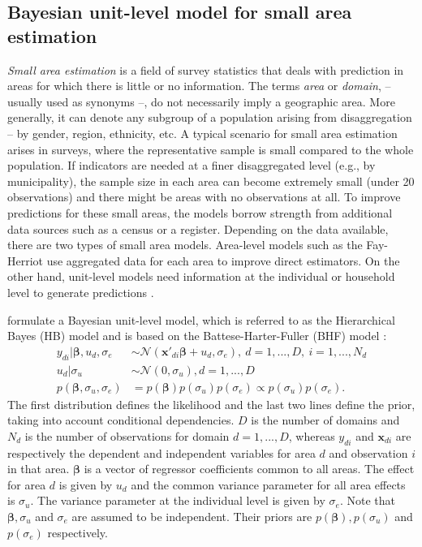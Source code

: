 \subsection{Bayesian unit-level model for small area estimation}

\textit{Small area estimation} is a field of survey statistics that deals with prediction in areas for which there is little or no information.
The terms \textit{area} or \textit{domain}, – usually used as synonyms –, do not necessarily imply a geographic area.
More generally, it can denote any subgroup of a population arising from disaggregation – by gender, region, ethnicity, etc.
A typical scenario for small area estimation arises in surveys, where the representative sample is small compared to the whole population.
If indicators are needed at a finer disaggregated level (e.g., by municipality), the sample size in each area can become extremely small (under 20 observations) and there might be areas with no observations at all.
To improve predictions for these small areas, the models borrow strength from additional data sources such as a census or a register.
Depending on the data available, there are two types of small area models.
Area-level models such as the Fay-Herriot use aggregated data for each area to improve direct estimators.
On the other hand, unit-level models need information at the individual or household level to generate predictions \citep[Chapter 1 and 2]{rao_small_2015}.

\cite{molina_small_2014} formulate a Bayesian unit-level model, which is referred to as the Hierarchical Bayes (HB) model and is based on the Battese-Harter-Fuller (BHF) model \citep{battese_error_1988}:
\begin{equation}
    \label{eq:hb_rao}
	\begin{split}
	y_{di} |\boldsymbol \beta, u_d, \sigma_e & \sim \mathcal N(\boldsymbol{x'}_{di} \boldsymbol{\beta}+ u_d, \sigma_e), ~ d = 1, ..., D, ~ i = 1, ..., N_d \\
	u_d | \sigma_u & \sim \mathcal N(0, \sigma_u), d = 1, ..., D \\
	p(\boldsymbol \beta, \sigma_u, \sigma_e) & = p(\boldsymbol \beta) p(\sigma_u)p(\sigma_e) \propto p(\sigma_u)p(\sigma_e).
	\end{split}
\end{equation}
The first distribution defines the likelihood and the last two lines define the prior, taking into account conditional dependencies.
$D$ is the number of domains and $N_d$ is the number of observations for domain $d = 1, ..., D$, whereas $y_{di}$ and $\boldsymbol{x}_{di}$ are respectively the dependent and independent variables for area $d$ and observation $i$ in that area.
$\boldsymbol \beta$ is a vector of regressor coefficients common to all areas.
The effect for area $d$ is given by $u_d$ and the common variance parameter for all area effects is $\sigma_u$.
The variance parameter at the individual level is given by $\sigma_e$.
Note that $\boldsymbol \beta, \sigma_u$ and $\sigma_e$ are assumed to be independent.
Their priors are $p(\boldsymbol \beta), p(\sigma_u)$ and $p(\sigma_e)$ respectively.

